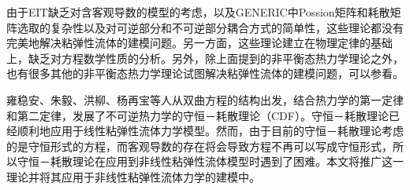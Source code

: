 由于EIT缺乏对含客观导数的模型的考虑，以及GENERIC中Possion矩阵和耗散矩阵选取的复杂性以及对可逆部分和不可逆部分耦合方式的简单性，这些理论都没有完美地解决粘弹性流体的建模问题。另一方面，这些理论建立在物理定律的基础上，缺乏对方程数学性质的分析。另外，除上面提到的非平衡态热力学理论之外，也有很多其他的非平衡态热力学理论试图解决粘弹性流体的建模问题，可以参看\cite{stratonovich2012nonlinear,huo1993nonequilibrium,eu1992kinetic}。

雍稳安、朱毅、洪柳、杨再宝等人从双曲方程的结构出发，结合热力学的第一定律和第二定律，发展了不可逆热力学的守恒－耗散理论（CDF）\cite{zhu2014conservation}。守恒－耗散理论已经顺利地应用于线性粘弹性流体力学模型。然而，由于目前的守恒－耗散理论考虑的是守恒形式的方程，而客观导数的存在将会导致方程不再可以写成守恒形式，所以守恒－耗散理论在应用到非线性粘弹性流体模型时遇到了困难。本文将推广这一理论并将其应用于非线性粘弹性流体力学的建模中。

